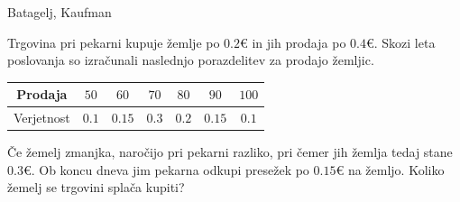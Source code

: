 \begin{naloga}{Batagelj, Kaufman}{\cite[Naloga~4.2]{bk}}
\begin{vprasanje}
Trgovina pri pekarni kupuje žemlje po $0.2 €$
in jih prodaja po $0.4 €$.
Skozi leta poslovanja so izračunali naslednjo porazdelitev za prodajo žemljic.
\begin{center}
\begin{tabular}{c|cccccc}
Prodaja & $50$ & $60$ & $70$ & $80$ & $90$ & $100$ \\
\hline
Verjetnost & $0.1$ & $0.15$ & $0.3$ & $0.2$ & $0.15$ & $0.1$
\end{tabular}
\end{center}
Če žemelj zmanjka, naročijo pri pekarni razliko,
pri čemer jih žemlja tedaj stane $0.3 €$.
Ob koncu dneva jim pekarna odkupi presežek po $0.15 €$ na žemljo.
Koliko žemelj se trgovini splača kupiti?
\end{vprasanje}


\end{naloga}
